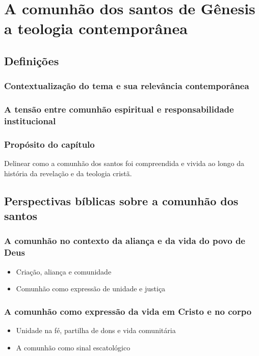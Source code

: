\newpage
\section{A comunhão dos santos de Gênesis a teologia contemporânea}

\subsection{Definições}
\subsubsection*{Contextualização do tema e sua relevância contemporânea}
\subsubsection*{A tensão entre comunhão espiritual e responsabilidade institucional}
\subsubsection*{Propósito do capítulo}
Delinear como a comunhão dos santos foi compreendida e vivida ao longo da história da revelação e da teologia cristã.

\subsection{Perspectivas bíblicas sobre a comunhão dos santos}
\subsubsection{A comunhão no contexto da aliança e da vida do povo de Deus}
\begin{itemize}
  \item Criação, aliança e comunidade
  \item Comunhão como expressão de unidade e justiça
\end{itemize}

\subsubsection{A comunhão como expressão da vida em Cristo e no corpo}
\begin{itemize}
  \item Unidade na fé, partilha de dons e vida comunitária
  \item A comunhão como sinal escatológico
\end{itemize}

